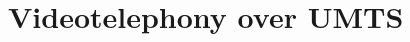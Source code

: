 \documentclass[10pt, conference, compsocconf]{IEEEtran}
\begin{document}







\section{Videotelephony over UMTS}
\label{par:3G324M}
\end{document}
